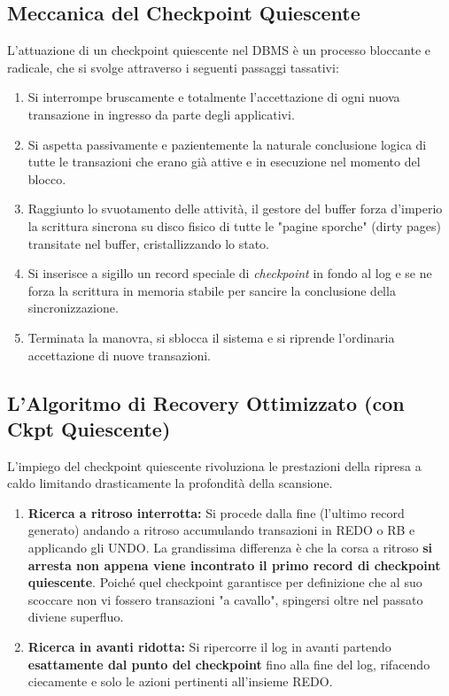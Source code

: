 \subsection{Meccanica del Checkpoint Quiescente}
L'attuazione di un checkpoint quiescente nel DBMS è un processo bloccante e radicale, che si svolge attraverso i seguenti passaggi tassativi:
\begin{enumerate}
    \item Si interrompe bruscamente e totalmente l'accettazione di ogni nuova transazione in ingresso da parte degli applicativi.
    \item Si aspetta passivamente e pazientemente la naturale conclusione logica di tutte le transazioni che erano già attive e in esecuzione nel momento del blocco.
    \item Raggiunto lo svuotamento delle attività, il gestore del buffer forza d'imperio la scrittura sincrona su disco fisico di tutte le "pagine sporche" (dirty pages) transitate nel buffer, cristallizzando lo stato.
    \item Si inserisce a sigillo un record speciale di \textit{checkpoint} in fondo al log e se ne forza la scrittura in memoria stabile per sancire la conclusione della sincronizzazione.
    \item Terminata la manovra, si sblocca il sistema e si riprende l'ordinaria accettazione di nuove transazioni.
\end{enumerate}

\subsection{L'Algoritmo di Recovery Ottimizzato (con Ckpt Quiescente)}
L'impiego del checkpoint quiescente rivoluziona le prestazioni della ripresa a caldo limitando drasticamente la profondità della scansione.

\begin{enumerate}
    \item \textbf{Ricerca a ritroso interrotta:} Si procede dalla fine (l'ultimo record generato) andando a ritroso accumulando transazioni in REDO o RB e applicando gli UNDO. La grandissima differenza è che la corsa a ritroso \textbf{si arresta non appena viene incontrato il primo record di checkpoint quiescente}. Poiché quel checkpoint garantisce per definizione che al suo scoccare non vi fossero transazioni "a cavallo", spingersi oltre nel passato diviene superfluo.
    \item \textbf{Ricerca in avanti ridotta:} Si ripercorre il log in avanti partendo \textbf{esattamente dal punto del checkpoint} fino alla fine del log, rifacendo ciecamente e solo le azioni pertinenti all'insieme REDO.
\end{enumerate}

